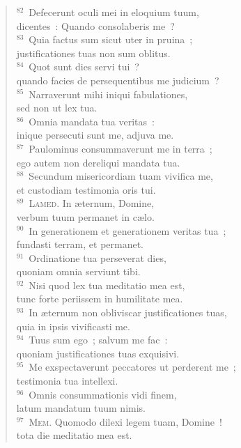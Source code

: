 \begin{verse}
${}^{82}$~Defecerunt oculi mei in eloquium tuum,\\ dicentes~: Quando consolaberis me~?\\
${}^{83}$~Quia factus sum sicut uter in pruina~;\\ justificationes tuas non sum oblitus.\\
${}^{84}$~Quot sunt dies servi tui~?\\ quando facies de persequentibus me judicium~?\\
${}^{85}$~Narraverunt mihi iniqui fabulationes,\\ sed non ut lex tua.\\
${}^{86}$~Omnia mandata tua veritas~:\\ inique persecuti sunt me, adjuva me.\\
${}^{87}$~Paulominus consummaverunt me in terra~;\\ ego autem non dereliqui mandata tua.\\
${}^{88}$~Secundum misericordiam tuam vivifica me,\\ et custodiam testimonia oris tui.\\
${}^{89}$~\textsc{Lamed.} In \ae ternum, Domine,\\ verbum tuum permanet in c\ae lo.\\
${}^{90}$~In generationem et generationem veritas tua~;\\ fundasti terram, et permanet.\\
${}^{91}$~Ordinatione tua perseverat dies,\\ quoniam omnia serviunt tibi.\\
${}^{92}$~Nisi quod lex tua meditatio mea est,\\ tunc forte periissem in humilitate mea.\\
${}^{93}$~In \ae ternum non obliviscar justificationes tuas,\\ quia in ipsis vivificasti me.\\
${}^{94}$~Tuus sum ego~; salvum me fac~:\\ quoniam justificationes tuas exquisivi.\\
${}^{95}$~Me exspectaverunt peccatores ut perderent me~;\\ testimonia tua intellexi.\\
${}^{96}$~Omnis consummationis vidi finem,\\ latum mandatum tuum nimis.\\
${}^{97}$~\textsc{Mem.} Quomodo dilexi legem tuam, Domine~!\\ tota die meditatio mea est.\\

\end{verse}
